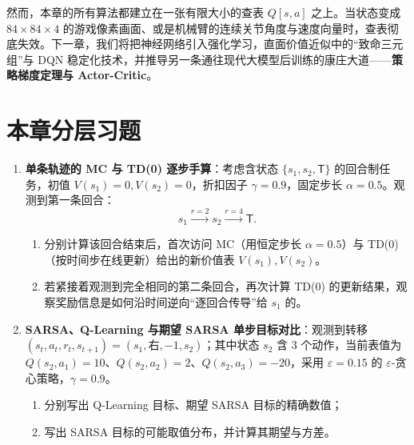 然而，本章的所有算法都建立在一张有限大小的查表 $Q[s, a]$ 之上。当状态变成 $84 \times 84 \times 4$ 的游戏像素画面、或是机械臂的连续关节角度与速度向量时，查表彻底失效。下一章，我们将把神经网络引入强化学习，直面价值近似中的“致命三元组”与 DQN 稳定化技术，并推导另一条通往现代大模型后训练的康庄大道——\textbf{策略梯度定理与 Actor-Critic}。

\section*{本章分层习题}


\begin{enumerate}
  \item[\textbf{6.1.1}] \textbf{单条轨迹的 MC 与 TD(0) 逐步手算}：考虑含状态 $\{s_1, s_2, \mathsf{T}\}$ 的回合制任务，初值 $V(s_1) = 0, V(s_2) = 0$，折扣因子 $\gamma = 0.9$，固定步长 $\alpha = 0.5$。观测到第一条回合：
  \[
    s_1 \xrightarrow{r=2} s_2 \xrightarrow{r=4} \mathsf{T}.
  \]
  \begin{enumerate}
    \item 分别计算该回合结束后，首次访问 MC（用恒定步长 $\alpha=0.5$）与 TD(0)（按时间步在线更新）给出的新价值表 $V(s_1), V(s_2)$。
    \item 若紧接着观测到完全相同的第二条回合，再次计算 TD(0) 的更新结果，观察奖励信息是如何沿时间逆向“逐回合传导”给 $s_1$ 的。
  \end{enumerate}

  \item[\textbf{6.1.2}] \textbf{SARSA、Q-Learning 与期望 SARSA 单步目标对比}：观测到转移 $(s_t, a_t, r_t, s_{t+1}) = (s_1, \text{右}, -1, s_2)$；其中状态 $s_2$ 含 3 个动作，当前表值为 $Q(s_2, a_1) = 10$、$Q(s_2, a_2) = 2$、$Q(s_2, a_3) = -20$，采用 $\varepsilon = 0.15$ 的 $\varepsilon$-贪心策略，$\gamma = 0.9$。
  \begin{enumerate}
    \item 分别写出 Q-Learning 目标、期望 SARSA 目标的精确数值；
    \item 写出 SARSA 目标的可能取值分布，并计算其期望与方差。
  \end{enumerate}
\end{enumerate}

